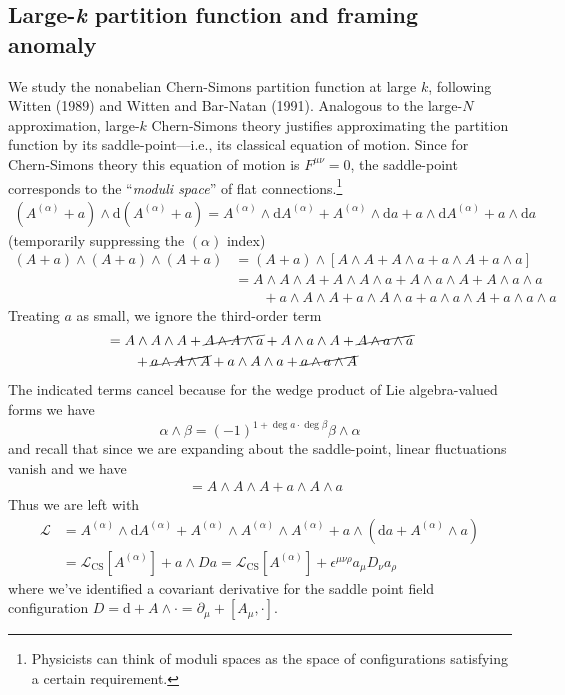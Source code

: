 \documentclass{report}
\begin{document}
\subsection{Large-\textit{k} partition function and framing anomaly}
We study the nonabelian Chern-Simons partition function at large $ k $, following 
Witten (1989) and Witten and Bar-Natan (1991). Analogous to the large-$ N $
approximation, large-$ k $ Chern-Simons theory justifies approximating the 
partition function by its saddle-point---i.e., its classical equation of motion. 
Since for Chern-Simons theory this equation of motion is $ F^{{\mu\nu}} = 0 $, 
the saddle-point corresponds to the ``\textit{moduli space}'' of flat
connections.\footnote{Physicists can think of moduli spaces as the space of
configurations satisfying a certain requirement.}
\begin{align*}
	(A^{(\alpha)} + a) \wedge \text{d}(A^{(\alpha)} + a)
		= A^{(\alpha)} \wedge \text{d}A^{(\alpha)} + A^{(\alpha)} \wedge \text{d}a 
			+ a\wedge \text{d}A^{(\alpha)} + a\wedge \text{d}a
\end{align*}
(temporarily suppressing the $ (\alpha) $ index)
\begin{align*}
	(A + a) \wedge (A + a) \wedge (A + a) 
		&= (A + a) \wedge \left[
			A \wedge A + A \wedge a + a \wedge A + a \wedge a
		\right] \\ 
		&= A \wedge A \wedge A 
			+ A \wedge A \wedge a 
			+ A \wedge a \wedge A 
			+ A \wedge a \wedge a \\
		&\qquad + a \wedge A \wedge A 
			+ a \wedge A \wedge a 
			+ a \wedge a \wedge A 
			+ a \wedge a \wedge a
\end{align*}
Treating $ a $ as small, we ignore the third-order term
\begin{align*}
	&= A \wedge A \wedge A 
				+ \cancel{A \wedge A \wedge a}
				+ A \wedge a \wedge A 
				+ \cancel{A \wedge a \wedge a} \\
			&\qquad + \cancel{a \wedge A \wedge A}
				+ a \wedge A \wedge a 
				+ \cancel{a \wedge a \wedge A }
\end{align*}
The indicated terms cancel because for the wedge product of Lie algebra-valued 
forms we have 
\begin{equation*}
	\alpha\wedge\beta = (-1)^{1 + \deg a\cdot \deg \beta} \beta\wedge \alpha
\end{equation*}
and recall that since we are expanding about the saddle-point, linear fluctuations 
vanish and we have
\begin{align*}
	&= A \wedge A \wedge A 
				+ a \wedge A \wedge a 
\end{align*}
Thus we are left with 
\begin{align*}
	\mathcal{L} &= A^{(\alpha)} \wedge \text{d} A^{(\alpha)}
					+ A^{(\alpha)} \wedge A^{(\alpha)} \wedge A^{(\alpha)}
					+ a\wedge(\text{d}a + A^{(\alpha)} \wedge a)\\ 
				&= \mathcal{L}_{\text{CS}}[A^{(\alpha)}]	
					+  a\wedge Da
				= \mathcal{L}_{\text{CS}}[A^{(\alpha)}]	
					+ \epsilon^{\mu\nu\rho} a_\mu D_{\nu} a_\rho
\end{align*}
where we've identified a covariant derivative for the saddle point field 
configuration $ D = \text{d} + A \wedge \cdot = \partial_\mu + [A_\mu,\cdot]$.
\end{document}
